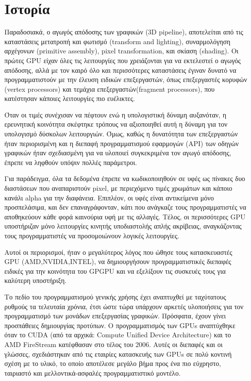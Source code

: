 \chapter{Ιστορία}
Παραδοσιακά, ο αγωγός απόδοσης των γραφικών (3D pipeline), αποτελείται από τις καταστάσεις μετατροπή και φωτισμό (transform and lighting), συναρμολόγηση αρχέγονων (primitive assembly), pixel transformation, και σκίαση (shading). Οι πρώτες GPU είχαν όλες τις λειτουργίες που χρειάζονται για να εκτελεστεί ο αγωγός απόδοσης, αλλά με τον καιρό όλο και περισσότερες καταστάσεις έγιναν δυνατό να προγραμματιστούν με την έλευση ειδικών επεξεργαστών, όπως επεξεργαστές κορυφών (vertex processors) και τεμάχια επεξεργαστών(fragment processors), που κατέστησαν κάποιες λειτουργίες πιο ευέλικτες.

Όταν οι τιμές συνέχισαν να πέφτουν ενώ η υπολογιστική δύναμη αυξανόταν, η ερευνητική κοινότητα σκέφτηκε τρόπους να αξιοποιηθεί αυτή η δύναμη για τον υπολογισμό δύσκολων λειτουργιών. Όμως, καθώς η δυνατότητα των επεξεργαστών ήταν περιορισμένη και η διεπαφή προγραμματισμού εφαρμογών (API) των οδηγών γραφικών ήταν σχεδιασμένη για να υλοποιεί συγκεκριμένα τον αγωγό απόδοσης, έπρεπε να ληφθούν υπόψιν πολλές παράμετροι.

Για παράδειγμα, όλα τα δεδομένα έπρεπε να κωδικοποιηθούν σε υφές ως πίνακες δυο διαστάσεων που αναπαριστούν pixel, με περιεχόμενο τιμές χρωμάτων και κάποιο κανάλι alpha για την διαφάνεια. Επιπλέον, οι υφές είναι αντικείμενα μόνο προσπελάσιμα, και δεν επαναγράφονταν, κάτι που ανάγκαζε τους προγραμματιστές να αποθηκεύουν κάθε φορά καινούρια υφή με τις αλλαγές. Τέλος, οι περισσότερες GPU υποστήριζαν μόνο λειτουργίες κινητής υποδιαστολής απλής ακρίβειας, αναγκάζοντας τους προγραμματιστές να προσομοιώνουν λογικές λειτουργίες.

Αυτοί οι περιορισμοί, ήταν ο μεγαλύτερος λόγος που ώθησε τους κατασκευαστές GPU (AMD,NVIDIA,INTEL), να δημιουργήσουν προγραμματιστικές διεπαφές ειδικές για την κοινότητα του GPGPU και να εξελίξουν τις συσκευές τους για καλύτερη υποστήριξη.

Το πεδίο του προγραμματισμού γενικής χρήσης έχει αναπτυχθεί με ταχύτατους ρυθμούς τα τελευταία χρόνια, έτσι ώστε τώρα υπάρχουν αρκετές υλοποιήσεις για τον προγραμματισμό των μονάδων επεξεργασίας γραφικών. Πρόσφατα, έχουν γίνει προσπάθειες δημιουργίας προτύπων.
Ο προγραμματισμός των GPUs αναπτύχθηκε όταν το CUDA (από τα αρχικά: Compute Unified Device Architecture) και το AMD FireStream κατέφθασαν στο τέλος του 2006. Αυτές οι διεπαφές και οι γλώσσες, σχεδιάστηκαν από τις εταιρίες κατασκευής των GPUs σε πολύ κοντινή σχέση με το υλικό, το οποίο αποτέλεσε μεγάλο βήμα προς ένα πιο εύχρηστο, ταιριαστό και μελλοντικά-ασφαλές προγραμματιστικό μοντέλο.

